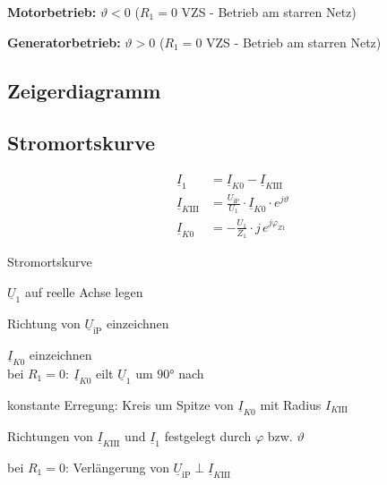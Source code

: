 \begin{sectionbox}
\textbf{Motorbetrieb:} $\vartheta < 0$ ($R_1 = 0$ VZS - Betrieb am starren Netz)
\begin{center}

\end{center}

\textbf{Generatorbetrieb:} $\vartheta > 0$ ($R_1 = 0$ VZS - Betrieb am starren Netz)
\begin{center}

\end{center}
\end{sectionbox}

\begin{sectionbox}
\subsection{Zeigerdiagramm}
\begin{center}

\end{center}
\end{sectionbox}

\begin{sectionbox}
\subsection{Stromortskurve}
\begin{align*}
\underline{I}_1 &= \underline{I}_{K0} - \underline I_{K\textrm{III}}\\
\underline I_{K\textrm{III}} &= \frac{U_\text{iP}}{U_1}\cdot \underline{I}_{K0}\cdot e^{j\vartheta}\\
\underline{I}_{K0} &= -\frac{U_1}{Z_1}\cdot j\, e^{j\varphi_{Z1}}
\end{align*}
\begin{cookbox}{Stromortskurve}
\item $\underline{U}_1$ auf reelle Achse legen
\item Richtung von $\underline{U}_\text{iP}$ einzeichnen
\item $\underline{I}_{K0}$ einzeichnen\\
bei $R_1 = 0:\ \underline{I}_{K0}$ eilt $\underline{U}_1$ um $\ang{90}$ nach
\item konstante Erregung: Kreis um Spitze von $\underline{I}_{K0}$ mit Radius $I_{K\textrm{III}}$
\item Richtungen von $\underline{I}_{K\textrm{III}}$ und $\underline{I}_1$ festgelegt durch $\varphi$ bzw. $\vartheta$
\item bei $R_1 = 0$: Verlängerung von $\underline{U}_\text{iP} \perp \underline{I}_{K\textrm{III}}$
\end{cookbox}
\begin{center}

\end{center}
\end{sectionbox}

